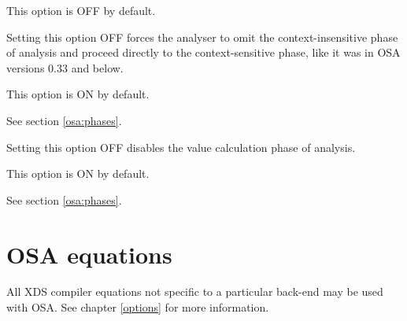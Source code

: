 \begin{description}
        This option is OFF by default.
   

        Setting this option OFF forces the analyser to omit the
        context-insensitive phase of analysis and proceed
        directly to the context-sensitive phase,
        like it was in OSA versions 0.33 and below.

        This option is ON by default.

        See section \ref{osa:phases}. 


        Setting this option OFF disables the value calculation phase
        of analysis.

        This option is ON by default.

        See section \ref{osa:phases}.

\ifonline \else
\end{description}
\fi


\section{OSA equations}
\label{osa:equations}

All XDS compiler equations not specific to a particular back-end
may be used with OSA. See chapter \ref{options} for more information.

